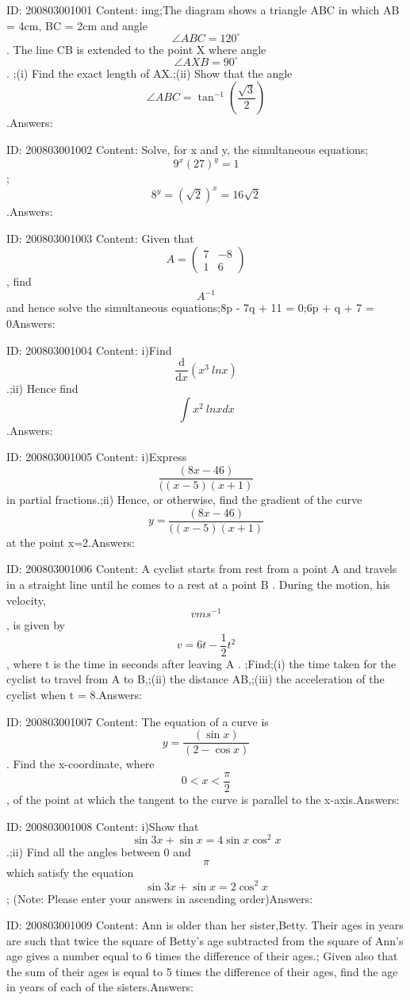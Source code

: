 \documentclass{article}
\begin{document}
ID: 200803001001
Content:
img;The diagram shows a triangle ABC in which AB = 4cm, BC = 2cm and angle $$ \angle ABC=120^{\circ}$$. The line CB is extended to the point X where angle $$ \angle AXB=90^{\circ}$$. ;(i) Find the exact length of AX.;(ii) Show that the angle $$ \angle ABC= \tan^{-1}(\frac{\sqrt{3}}{2})$$.Answers:

ID: 200803001002
Content:
Solve, for x and y, the simultaneous equations;$$9^x(27)^y = 1$$;$$8^y =(\sqrt2)^x = 16\sqrt2$$.Answers:

ID: 200803001003
Content:
Given that $$A = \begin{pmatrix}7 & -8\\  1& 6\end{pmatrix}$$, find $$A^{-1}$$ and hence solve the simultaneous equations;8p - 7q + 11 = 0;6p + q + 7 = 0Answers:

ID: 200803001004
Content:
i)Find $$ \frac{\mathrm{d} }{\mathrm{d} x} (x^3\ ln x)$$.;ii) Hence find $$\int x^2\ ln x dx$$.Answers:

ID: 200803001005
Content:
i)Express $$\frac{(8x-46)}{((x-5)(x+1)}$$ in partial fractions.;ii) Hence, or otherwise, find the gradient of the curve $$y=\frac{(8x-46)}{((x-5)(x+1)}$$ at the point x=2.Answers:

ID: 200803001006
Content:
A cyclist starts from rest from a point A and travels in a straight line until he comes to a rest at a point B . During the motion, his velocity, $$v ms^{-1}$$, is given by $$v = 6t-\frac{1}{2}t^2$$, where t is the time in seconds after leaving A . ;Find;(i) the time taken for the cyclist to travel from A to B,;(ii) the distance AB,;(iii) the acceleration of the cyclist when t = 8.Answers:

ID: 200803001007
Content:
The equation of a curve is $$y = \frac{(\sin  x )}{(2 - \cos  x)}$$. Find the x-coordinate, where $$0< x< \frac{\pi}{2} $$, of the point at which the tangent to the curve is parallel to the x-axis.Answers:

ID: 200803001008
Content:
i)Show that $$\sin 3x + \sin  x = 4 \sin  x \cos ^2 x$$.;ii) Find all the angles between 0 and $$\pi$$ which satisfy the equation $$\sin  3x + \sin  x = 2 \cos ^2x$$; (Note: Please enter your answers in ascending order)Answers:

ID: 200803001009
Content:
Ann is older than her sister,Betty. Their ages in years are such that twice the square of Betty's age subtracted from the square of Ann's age gives a number equal to 6 times the difference of their ages.; Given also that the sum of their ages is equal to 5 times the difference of their ages, find the age in years of each of the sisters.Answers:
\end{document}
